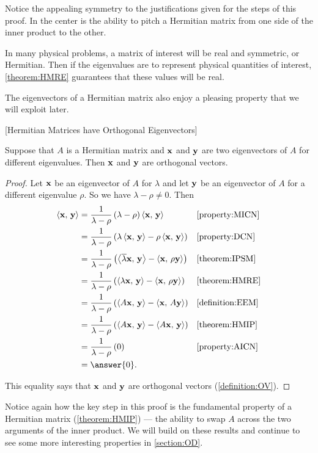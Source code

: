 \documentclass{ximera}
\begin{document}
Notice the appealing symmetry to the justifications given for the
steps of this proof.  In the center is the ability to pitch a
Hermitian matrix from one side of the inner product to the other.

In many physical problems, a matrix of interest will be real and
symmetric, or Hermitian.  Then if the eigenvalues are to represent
physical quantities of interest, \ref{theorem:HMRE} guarantees that
these values will be real.

The eigenvectors of a Hermitian matrix also enjoy a pleasing property
that we will exploit later.

\begin{theorem}
\label{theorem:HMOE}
[Hermitian Matrices have Orthogonal Eigenvectors]

Suppose that $A$ is a Hermitian matrix and $\mathbf{x}$ and $\mathbf{y}$ are two eigenvectors of $A$ for different eigenvalues.  Then $\mathbf{x}$ and $\mathbf{y}$ are orthogonal vectors.

\begin{proof}
Let $\mathbf{x}$ be an eigenvector of $A$ for $\lambda$ and let $\mathbf{y}$ be an eigenvector of $A$ for a different eigenvalue $\rho$.   So we have $\lambda-\rho\neq 0$.  Then
\begin{align*}
\innerproduct{\vect{x}}{\vect{y}}
&=\frac{1}{\lambda-\rho}\left(\lambda-\rho\right)\innerproduct{\vect{x}}{\vect{y}}
&&\ref{property:MICN}\\
&=\frac{1}{\lambda-\rho}
\left(\lambda\innerproduct{\vect{x}}{\vect{y}}-\rho\innerproduct{\vect{x}}{\vect{y}}\right)
&&\ref{property:DCN}\\
&=\frac{1}{\lambda-\rho}
\left(\innerproduct{\conjugate{\lambda}\vect{x}}{\vect{y}}-\innerproduct{\vect{x}}{\rho\vect{y}}\right)
&&\ref{theorem:IPSM}\\
&=\frac{1}{\lambda-\rho}
\left(\innerproduct{\lambda\vect{x}}{\vect{y}}-\innerproduct{\vect{x}}{\rho\vect{y}}\right)
&&\ref{theorem:HMRE}\\
&=\frac{1}{\lambda-\rho}
\left(\innerproduct{A\vect{x}}{\vect{y}}-\innerproduct{\vect{x}}{A\vect{y}}\right)
&&\ref{definition:EEM}\\
&=\frac{1}{\lambda-\rho}
\left(\innerproduct{A\vect{x}}{\vect{y}}-\innerproduct{A\vect{x}}{\vect{y}}\right)
&&\ref{theorem:HMIP}\\
&=\frac{1}{\lambda-\rho}\left(0\right)
&&\ref{property:AICN}\\
&=\answer{0}.
\end{align*}

This equality says that $\mathbf{x}$ and $\mathbf{y}$ are orthogonal vectors (\ref{definition:OV}).

\end{proof}
\end{theorem}

Notice again how the key step in this proof is the fundamental property of a Hermitian matrix (\ref{theorem:HMIP}) --- the ability to swap $A$ across the two arguments of the inner product.  We will build on these results and continue to see some more interesting properties in \ref{section:OD}.
\end{document}
